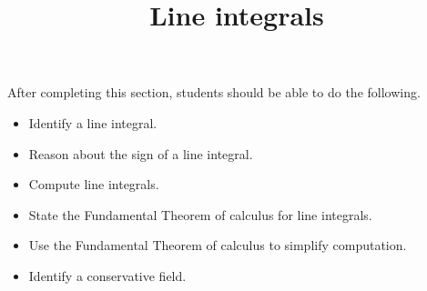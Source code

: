 \documentclass{ximera}
\title{Line integrals}
\begin{document}
\begin{abstract}
\end{abstract}
\maketitle

\begin{sectionOutcomes}

After completing this section, students should be able to do the following.

\begin{itemize}
\item Identify a line integral.
\item Reason about the sign of a line integral.
\item Compute line integrals.
\item State the Fundamental Theorem of calculus for line integrals.
\item Use the Fundamental Theorem of calculus to simplify computation.
\item Identify a conservative field.
\end{itemize}

\end{sectionOutcomes}
\end{document}
